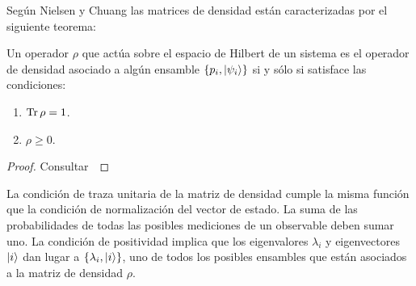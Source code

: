 Según Nielsen y Chuang \cite{nielsen_chuang_2011} las matrices
de densidad están caracterizadas por el siguiente teorema:
\begin{thm}\label{teo:density-operator}
Un operador $\rho$  que actúa sobre el espacio de Hilbert de un sistema 
es el operador de densidad asociado a algún ensamble 
$\{p_i, \ket{\psi _i} \}$ si y sólo si satisface las condiciones:
\begin{enumerate}
\item $\Tr \rho = 1$.
\item $\rho \geq 0$.
\end{enumerate}	
\end{thm} 
\begin{proof} Consultar~\cite[p.~101]{nielsen_chuang_2011} \end{proof}

La condición de traza unitaria de la matriz de densidad cumple la misma
función que la condición de normalización del vector de estado. La
suma de las probabilidades de todas las posibles mediciones 
de un observable deben sumar uno. La condición de positividad 
implica que los eigenvalores $\lambda_i$ y eigenvectores
$\ket{i}$ dan lugar a $\{\lambda_i, \ket{i}\}$, uno de todos los 
posibles ensambles que están asociados a la matriz de densidad $\rho$.

